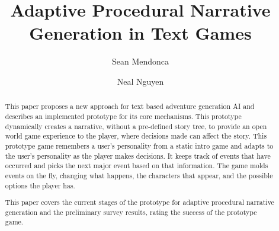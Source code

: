 \documentclass[sigconf]{acmart}
\begin{document}
\title{Adaptive Procedural Narrative Generation in Text Games}

\author{Sean Mendonca}

\author{Neal Nguyen}

\renewcommand{\shortauthors}{Mendonca, Nguyen}

\begin{abstract}
This paper proposes a new approach for text based adventure generation AI and describes an implemented prototype for its core mechanisms. This prototype dynamically creates a narrative, without a pre-defined story tree, to provide an open world game experience to the player, where decisions made can affect the story. This prototype game remembers a user's personality from a static intro game and adapts to the user's personality as the player makes decisions. It keeps track of events that have occurred and picks the next major event based on that information. The game molds events on the fly, changing what happens, the characters that appear, and the possible options the player has.

This paper covers the current stages of the prototype for adaptive procedural narrative generation and the preliminary survey results, rating the success of the prototype game.
\end{abstract}

\maketitle










%
\end{document}
